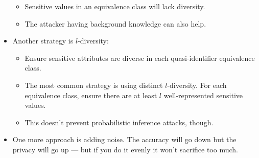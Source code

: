 \documentclass{article}
\begin{document}
\begin{itemize}
\begin{itemize}
            \item Sensitive values in an equivalence class will lack diversity.
            \item The attacker having background knowledge can also help.
        \end{itemize}
    \item Another strategy is $l$-diversity:
        \begin{itemize}
            \item Ensure sensitive attributes are diverse in each quasi-identifier equivalence class.
            \item The most common strategy is using distinct $l$-diversity.  For each equivalence class, ensure there are at least $l$ well-represented sensitive values.
            \item This doesn't prevent probabilistic inference attacks, though.
        \end{itemize}
    \item One more approach is adding noise.  The accuracy will go down but the privacy will go up --- but if you do it evenly it won't sacrifice too much.
\end{itemize}
\end{document}
